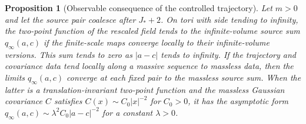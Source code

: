 \documentclass[11pt]{article}
\newtheorem{proposition}{Proposition}[section]
\begin{document}
\begin{proposition}[Observable consequence of the controlled trajectory]
Let \(m>0\) and let the source pair coalesce after \(J_*+2\).
On tori with side tending to infinity, the two-point
function of the rescaled field tends to the infinite-volume
source sum \(q_\infty(a,c)\) if the finite-scale maps converge
locally to their infinite-volume versions. This sum tends to zero
as \(|a-c|\) tends to infinity. If the trajectory and covariance
data tend locally along a massive sequence to massless data, then
the limits \(q_\infty(a,c)\) converge at each fixed pair to the
massless source sum. When the latter is a translation-invariant
two-point function and the massless Gaussian covariance \(C\)
satisfies \(C(x)\sim C_0|x|^{-2}\) for \(C_0>0\), it has the
asymptotic form \(q_\infty(a,c)\sim \lambda^2 C_0|a-c|^{-2}\)
for a constant \(\lambda>0\).
\end{proposition}
\end{document}
